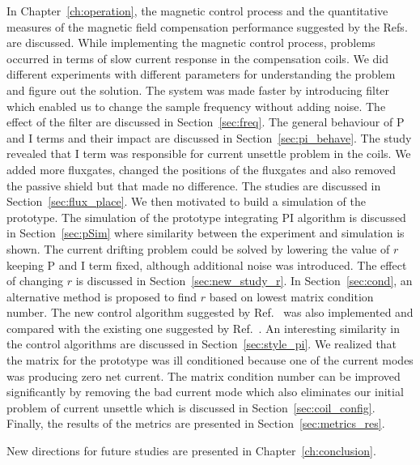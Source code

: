 In Chapter~\ref{ch:operation}, the magnetic control process and the
quantitative measures of the magnetic field compensation performance
suggested by the Refs.~\cite{bea,lins,rawlik} are discussed. While implementing the magnetic control process, problems occurred in terms of slow
current response in the compensation coils. We did different
experiments with different parameters for understanding the problem
and figure out the solution. The system was made faster by introducing
filter which enabled us to change the sample frequency without adding
noise. The effect of the filter are discussed in
Section~\ref{sec:freq}. The general behaviour
of P and I terms and their impact are
discussed in Section~\ref{sec:pi_behave}. The study
revealed that I term was responsible for current unsettle problem in the
coils. We added more fluxgates, changed the positions
of the fluxgates and also removed the passive shield but that made no difference. The studies are discussed in Section~\ref{sec:flux_place}. We then motivated to build a
simulation of the prototype. The simulation of the prototype
integrating PI algorithm is discussed in Section~\ref{sec:pSim} where
similarity between the experiment and simulation is shown. The current drifting problem could be solved by lowering the value of $r$ keeping P
and I term fixed, although additional noise was introduced. The effect of changing $r$ is discussed in Section~\ref{sec:new_study_r}. In Section~\ref{sec:cond}, an alternative method is proposed to find $r$ based on lowest matrix condition number. The new control algorithm suggested by Ref.~\cite{rawlik} was also implemented and compared with the existing one suggested by Ref.~\cite{bea}. An interesting similarity in the control algorithms are discussed in Section~\ref{sec:style_pi}. We realized that the matrix for the prototype was ill conditioned because one of the current modes was producing zero net current. The matrix condition number can be improved significantly by removing the bad current mode which also eliminates our initial problem of current unsettle which is discussed in Section~\ref{sec:coil_config}. Finally, the results of the metrics are presented in Section~\ref{sec:metrics_res}. 

New directions for future studies are presented in
Chapter~\ref{ch:conclusion}.

